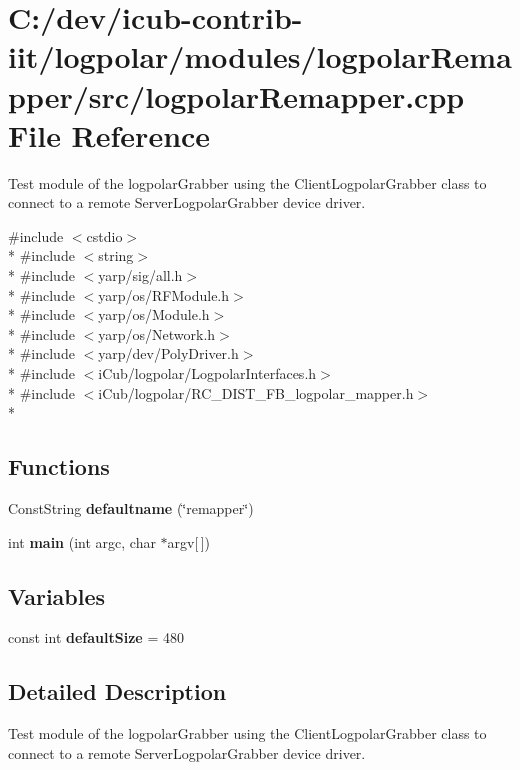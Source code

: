 \section{C\+:/dev/icub-\/contrib-\/iit/logpolar/modules/logpolar\+Remapper/src/logpolar\+Remapper.cpp File Reference}
\label{logpolarRemapper_8cpp}


Test module of the logpolar\+Grabber using the Client\+Logpolar\+Grabber class to connect to a remote Server\+Logpolar\+Grabber device driver.  


{\ttfamily \#include $<$cstdio$>$}\\*
{\ttfamily \#include $<$string$>$}\\*
{\ttfamily \#include $<$yarp/sig/all.\+h$>$}\\*
{\ttfamily \#include $<$yarp/os/\+R\+F\+Module.\+h$>$}\\*
{\ttfamily \#include $<$yarp/os/\+Module.\+h$>$}\\*
{\ttfamily \#include $<$yarp/os/\+Network.\+h$>$}\\*
{\ttfamily \#include $<$yarp/dev/\+Poly\+Driver.\+h$>$}\\*
{\ttfamily \#include $<$i\+Cub/logpolar/\+Logpolar\+Interfaces.\+h$>$}\\*
{\ttfamily \#include $<$i\+Cub/logpolar/\+R\+C\+\_\+\+D\+I\+S\+T\+\_\+\+F\+B\+\_\+logpolar\+\_\+mapper.\+h$>$}\\*
\subsection*{Functions}
\begin{DoxyCompactItemize}
\item 
Const\+String {\bfseries defaultname} (\char`\"{}remapper\char`\"{})\label{logpolarRemapper_8cpp_af5a9ba1c961472c13ade724bf3d5d97e}

\item 
int {\bfseries main} (int argc, char $\ast$argv\mbox{[}$\,$\mbox{]})\label{logpolarRemapper_8cpp_a0ddf1224851353fc92bfbff6f499fa97}

\end{DoxyCompactItemize}
\subsection*{Variables}
\begin{DoxyCompactItemize}
\item 
const int {\bfseries default\+Size} = 480\label{logpolarRemapper_8cpp_acb8c5832ed76188aaa0e67cbf55f97dc}

\end{DoxyCompactItemize}


\subsection{Detailed Description}
Test module of the logpolar\+Grabber using the Client\+Logpolar\+Grabber class to connect to a remote Server\+Logpolar\+Grabber device driver. 


